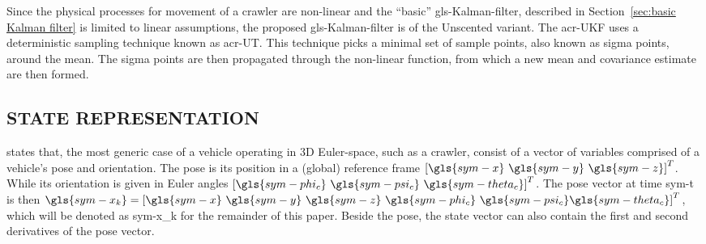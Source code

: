 Since the physical processes for movement of a crawler are non-linear and the ``basic'' \gls{gls-Kalman-filter},
described in Section~\ref{sec:basic Kalman filter} is limited to linear assumptions, the proposed
\gls{gls-Kalman-filter} is of the Unscented variant. The \gls{acr-UKF} uses a deterministic sampling technique
known as \gls{acr-UT}. This technique picks a minimal set of sample points, also known as sigma points, around
the mean. The sigma points are then propagated through the non-linear function, from which a new mean and covariance
estimate are then formed.

\subsection{STATE REPRESENTATION}\label{sec:state representation}

\citet{bahr_cooperative_2009} states that, the most generic case of a vehicle operating in 3D Euler-space, such as a
crawler, consist of a vector of variables comprised of a vehicle's pose and orientation. The pose is its position in a
(global) reference frame \( \left[\gls{sym-x} ~\gls{sym-y} ~\gls{sym-z}\right]^T \). While its orientation is given in
Euler angles \( \left[\gls{sym-phi_c} ~\gls{sym-psi_c} ~\gls{sym-theta_c}\right]^T \). The pose vector at time
\gls{sym-t} is then \( \gls{sym-x_k} = \left[\gls{sym-x} ~\gls{sym-y} ~\gls{sym-z} ~\gls{sym-phi_c} ~\gls{sym-psi_c}
\gls{sym-theta_c}\right]^T \), which will be denoted as  \gls{sym-x_k} for the remainder of this paper. Beside the pose,
the state vector can also contain the first and second derivatives of the pose vector.

